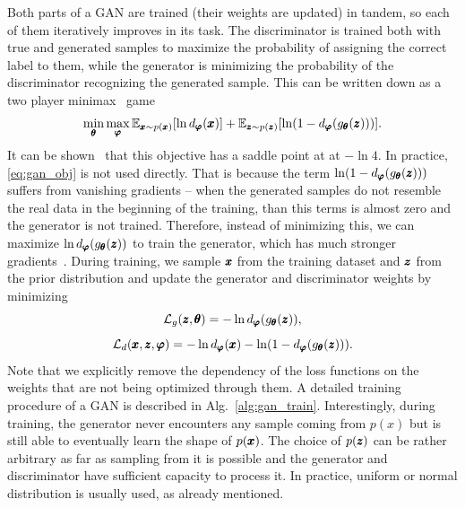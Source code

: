 Both parts of a GAN are trained (their weights are updated) in tandem, so each of them iteratively improves in its task. The discriminator is trained both with true and generated samples to maximize the probability of assigning the correct label to them, while the generator is minimizing the probability of the discriminator recognizing the generated sample. This can be written down as a two player minimax~\cite{maschler2020game} game 
\begin{equation} \label{eq:gan_obj}
\min_{\vc{\theta}}\max_{\vc{\varphi}}\mathbb{E}_{ \vc{x} \sim p(\vc{x})}\left[\ln d_{\vc{\varphi}}(\vc{x})\right]+\mathbb{E}_{\vc{z}\sim p(\vc{z})}\left[\ln\left(1-d_{\vc{\varphi}}(g_{\vc{\theta}}(\vc{z}))\right)\right].
\end{equation}
It can be shown~\cite{goodfellow2014gan} that this objective has a saddle point at at $-\ln4$. In practice, \eqref{eq:gan_obj} is not used directly. That is because the term $\ln\left(1-d_{\vc{\varphi}}(g_{\vc{\theta}}(\vc{z}))\right)$ suffers from vanishing gradients -- when the generated samples do not resemble the real data in the beginning of the training, than this terms is almost zero and the generator is not trained. Therefore, instead of minimizing this, we can maximize $\ln d_{\pmb{{\varphi}}}(g_{\pmb{{\theta}}}(\pmb{{z}}))$ to train the generator, which has much stronger gradients~\cite{goodfellow2014gan}. During training, we sample $\pmb{{x}}$ from the training dataset and $\pmb{{z}}$ from the prior distribution and update the generator and discriminator weights by minimizing
\begin{equation}\label{eq:gen_loss}
\mathcal{L}_{g}(\pmb{{z}},\pmb{{\theta}})= - \ln d_{\pmb{{\varphi}}}(g_{\pmb{{\theta}}}(\pmb{{z}})),
\end{equation}
\begin{equation}\label{eq:disc_loss}
\mathcal{L}_{d}(\vc{x},\vc{z},\vc{\varphi})= - \ln d_{\vc{\varphi}}(\vc{x}) - \ln\left(1-d_{\vc{\varphi}}(g_{\vc{\theta}}(\vc{z}))\right).
\end{equation}
Note that we explicitly remove the dependency of the loss functions on the weights that are not being optimized through them. A detailed training procedure of a GAN is described in Alg.~\ref{alg:gan_train}. Interestingly, during training, the generator never encounters any sample coming from $p(x)$ but is still able to eventually learn the shape of $p(\pmb{{x}})$. The choice of $p(\pmb{{z}})$ can be rather arbitrary as far as sampling from it is possible and the generator and discriminator have sufficient capacity to process it. In practice, uniform or normal distribution is usually used, as already mentioned. 

